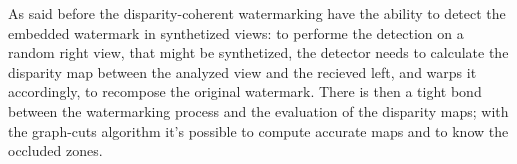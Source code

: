As said before the disparity-coherent watermarking have the ability to detect the embedded watermark in synthetized views: to performe the detection on a random right view, that might be synthetized, the detector needs to calculate the disparity map between the analyzed view and the recieved left, and warps it accordingly, to recompose the original watermark.\newline 
There is then a tight bond between the watermarking process and the evaluation of the disparity maps; with the graph-cuts algorithm it's possible to compute accurate maps and to know the occluded zones.

